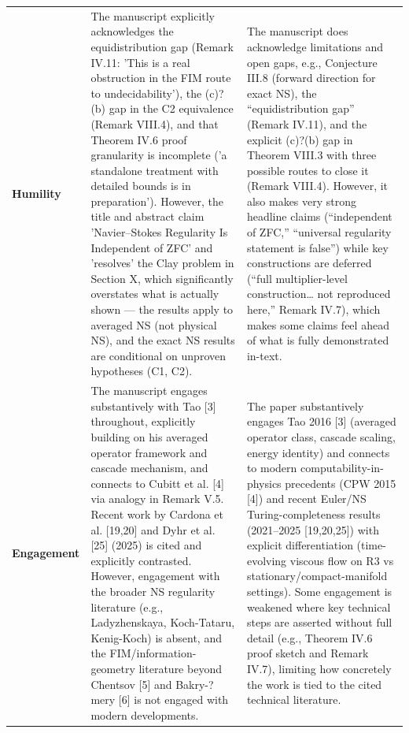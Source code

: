 \documentclass[11pt]{article}
\begin{document}
\begin{longtable}{@{} p{2.2cm} p{6.3cm} p{6.3cm} @{}}
\rowcolor{rowgray}
\textbf{Humility} &
The manuscript explicitly acknowledges the equidistribution gap (Remark IV.11: 'This is a real obstruction in the FIM route to undecidability'), the (c)?(b) gap in the C2 equivalence (Remark VIII.4), and that Theorem IV.6 proof granularity is incomplete ('a standalone treatment with detailed bounds is in preparation'). However, the title and abstract claim 'Navier--Stokes Regularity Is Independent of ZFC' and 'resolves' the Clay problem in Section X, which significantly overstates what is actually shown --- the results apply to averaged NS (not physical NS), and the exact NS results are conditional on unproven hypotheses (C1, C2). &
The manuscript does acknowledge limitations and open gaps, e.g., Conjecture III.8 (forward direction for exact NS), the ``equidistribution gap'' (Remark IV.11), and the explicit (c)?(b) gap in Theorem VIII.3 with three possible routes to close it (Remark VIII.4). However, it also makes very strong headline claims (``independent of ZFC,'' ``universal regularity statement is false'') while key constructions are deferred (``full multiplier-level construction\ldots{} not reproduced here,'' Remark IV.7), which makes some claims feel ahead of what is fully demonstrated in-text. \\[6pt]

\textbf{Engagement} &
The manuscript engages substantively with Tao [3] throughout, explicitly building on his averaged operator framework and cascade mechanism, and connects to Cubitt et al. [4] via analogy in Remark V.5. Recent work by Cardona et al. [19,20] and Dyhr et al. [25] (2025) is cited and explicitly contrasted. However, engagement with the broader NS regularity literature (e.g., Ladyzhenskaya, Koch-Tataru, Kenig-Koch) is absent, and the FIM/information-geometry literature beyond Chentsov [5] and Bakry-?mery [6] is not engaged with modern developments. &
The paper substantively engages Tao 2016 [3] (averaged operator class, cascade scaling, energy identity) and connects to modern computability-in-physics precedents (CPW 2015 [4]) and recent Euler/NS Turing-completeness results (2021--2025 [19,20,25]) with explicit differentiation (time-evolving viscous flow on R3 vs stationary/compact-manifold settings). Some engagement is weakened where key technical steps are asserted without full detail (e.g., Theorem IV.6 proof sketch and Remark IV.7), limiting how concretely the work is tied to the cited technical literature. \\[6pt]


\end{longtable}
\end{document}
